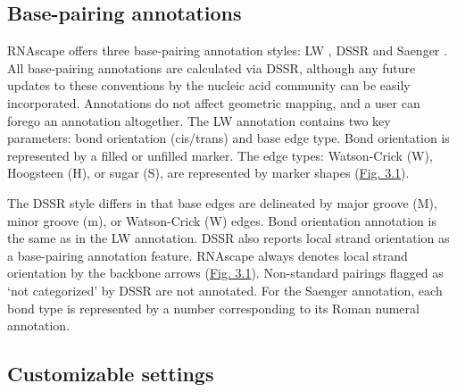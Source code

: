\subsection{Base-pairing annotations}

RNAscape offers three base-pairing annotation styles: LW \citep{Yang2003, Leontis2001}, DSSR \citep{lu2015dssr} and Saenger \citep{Saenger1984}. All base-pairing annotations are calculated via DSSR, although any future updates to these conventions by the nucleic acid community can be easily incorporated. Annotations do not affect geometric mapping, and a user can forego an annotation altogether. The LW annotation contains two key parameters: bond orientation (cis/trans) and base edge type. Bond orientation is represented by a filled or unfilled marker. The edge types: Watson-Crick (W), Hoogsteen (H), or sugar (S), are represented by marker shapes (\hyperref[fig:rnascape1]{Fig. 3.1}).

The DSSR style differs in that base edges are delineated by major groove (M), minor groove (m), or Watson-Crick (W) edges. Bond orientation annotation is the same as in the LW \citep{Yang2003, Leontis2001} annotation. DSSR also reports local strand orientation as a base-pairing annotation feature. RNAscape always denotes local strand orientation by the backbone arrows (\hyperref[fig:rnascape1]{Fig. 3.1}). Non-standard pairings flagged as ‘not categorized’ by DSSR are not annotated. For the Saenger \citep{Saenger1984} annotation, each bond type is represented by a number corresponding to its Roman numeral annotation.

\subsection{Customizable settings}

